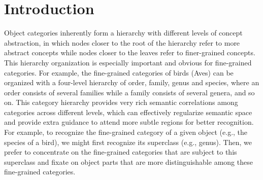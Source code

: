 \documentclass[sigconf]{acmart}
\begin{document}


\iffalse

\begin{CCSXML}
<ccs2012>
 <concept>
  <concept_id>10010520.10010553.10010562</concept_id>
  <concept_desc>Computer systems organization~Embedded systems</concept_desc>
  <concept_significance>500</concept_significance>
 </concept>
 <concept>
  <concept_id>10010520.10010575.10010755</concept_id>
  <concept_desc>Computer systems organization~Redundancy</concept_desc>
  <concept_significance>300</concept_significance>
 </concept>
 <concept>
  <concept_id>10010520.10010553.10010554</concept_id>
  <concept_desc>Computer systems organization~Robotics</concept_desc>
  <concept_significance>100</concept_significance>
 </concept>
 <concept>
  <concept_id>10003033.10003083.10003095</concept_id>
  <concept_desc>Networks~Network reliability</concept_desc>
  <concept_significance>100</concept_significance>
 </concept>
</ccs2012>  
\end{CCSXML}

\ccsdesc[500]{Computer systems organization~Embedded systems}
\ccsdesc[300]{Computer systems organization~Redundancy}
\ccsdesc{Computer systems organization~Robotics}
\ccsdesc[100]{Networks~Network reliability}
\fi


\maketitle

\section{Introduction}
Object categories inherently form a hierarchy with different levels of concept abstraction, in which nodes closer to the root of the hierarchy refer to more abstract concepts while nodes closer to the leaves refer to finer-grained concepts. This hierarchy organization is especially important and obvious for fine-grained categories. For example, the fine-grained categories of birds (Aves) can be organized with a four-level hierarchy of order, family, genus and species, where an order consists of several families while a family consists of several genera, and so on. This category hierarchy provides very rich semantic correlations among categories across different levels, which can effectively regularize semantic space and provide extra guidance to attend more subtle regions for better recognition. For example, to recognize the fine-grained category of a given object (e.g., the species of a bird), we might first recognize its superclass (e.g., genus). Then, we prefer to concentrate on the fine-grained categories that are subject to this superclass and fixate on object parts that are more distinguishable among these fine-grained categories.
\end{document}
